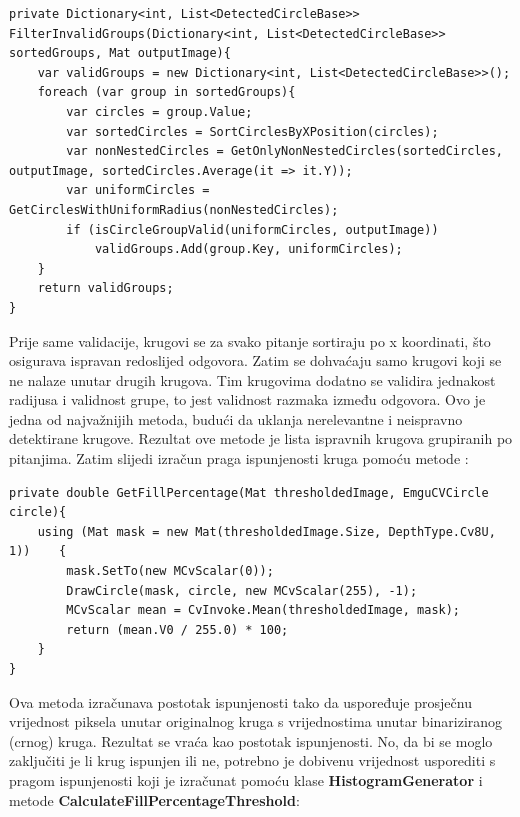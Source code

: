 \documentclass{foi}
\begin{document}
\begin{lstlisting}[caption={Metoda za filtriranje neispravnih krugova i pitanja}]
private Dictionary<int, List<DetectedCircleBase>> FilterInvalidGroups(Dictionary<int, List<DetectedCircleBase>> sortedGroups, Mat outputImage){
    var validGroups = new Dictionary<int, List<DetectedCircleBase>>();
    foreach (var group in sortedGroups){
        var circles = group.Value;
        var sortedCircles = SortCirclesByXPosition(circles);
        var nonNestedCircles = GetOnlyNonNestedCircles(sortedCircles, outputImage, sortedCircles.Average(it => it.Y));
        var uniformCircles = GetCirclesWithUniformRadius(nonNestedCircles);
        if (isCircleGroupValid(uniformCircles, outputImage))
            validGroups.Add(group.Key, uniformCircles);
    }
    return validGroups;
}
\end{lstlisting}

Prije same validacije, krugovi se za svako pitanje sortiraju po x koordinati, što osigurava ispravan redoslijed odgovora. Zatim se dohvaćaju samo krugovi koji se ne nalaze unutar drugih krugova. Tim krugovima dodatno se validira jednakost radijusa i validnost grupe, to jest validnost razmaka između odgovora. Ovo je jedna od najvažnijih metoda, budući da uklanja nerelevantne i neispravno detektirane krugove. Rezultat ove metode je lista ispravnih krugova grupiranih po pitanjima. Zatim slijedi izračun praga ispunjenosti kruga pomoću metode \textbf{}:



\begin{lstlisting}[caption={Metoda za izračun postotka ispunjenosti kruga}]
private double GetFillPercentage(Mat thresholdedImage, EmguCVCircle circle){
    using (Mat mask = new Mat(thresholdedImage.Size, DepthType.Cv8U, 1))    {
        mask.SetTo(new MCvScalar(0));
        DrawCircle(mask, circle, new MCvScalar(255), -1);
        MCvScalar mean = CvInvoke.Mean(thresholdedImage, mask);
        return (mean.V0 / 255.0) * 100;
    }
}
\end{lstlisting}

Ova metoda izračunava postotak ispunjenosti tako da uspoređuje prosječnu vrijednost piksela unutar originalnog kruga s vrijednostima unutar binariziranog (crnog) kruga. Rezultat se vraća kao postotak ispunjenosti.
\pagebreak
No, da bi se moglo zaključiti je li krug ispunjen ili ne, potrebno je dobivenu vrijednost usporediti s pragom ispunjenosti koji je izračunat pomoću klase \textbf{HistogramGenerator} i metode \textbf{CalculateFillPercentageThreshold}:
\end{document}
